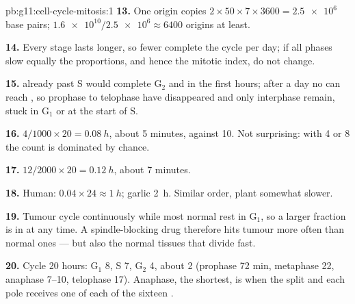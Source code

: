 \begin{solution}{pb:g11:cell-cycle-mitosis:1}
\textbf{13.} One origin copies $2 \times 50 \times 7 \times 3600 =
\num{2.5e6}$ base pairs; $\num{1.6e10}/\num{2.5e6} \approx 6400$
origins at least.

\textbf{14.} Every stage lasts longer, so fewer  complete the
cycle per day; if all phases slow equally the proportions, and hence
the mitotic index, do not change.

\textbf{15.}  already past S would complete $\mathrm{G_2}$ and
 in the first hours; after a day no  can reach , so
prophase to telophase have disappeared and only interphase 
remain, stuck in $\mathrm{G_1}$ or at the start of S.

\textbf{16.} $4/1000 \times 20 = \qty{0.08}{h}$, about 5 minutes,
against 10. Not surprising: with 4 or 8  the count is dominated
by chance.

\textbf{17.} $12/2000 \times 20 = \qty{0.12}{h}$, about 7 minutes.

\textbf{18.} Human: $0.04 \times 24 \approx \qty{1}{h}$; garlic
\qty{2}{h}. Similar order, plant  somewhat slower.

\textbf{19.} Tumour  cycle continuously while most normal 
rest in $\mathrm{G_1}$, so a larger fraction is in  at any
time. A spindle-blocking drug therefore hits tumour  more often
than normal ones --- but also the normal tissues that divide fast.

\textbf{20.} Cycle 20 hours: $\mathrm{G_1}$ 8, S 7, $\mathrm{G_2}$ 4,
 about 2 (prophase 72 min, metaphase 22, anaphase 7--10,
telophase 17). Anaphase, the shortest, is when the  split
and each pole receives one  of each of the sixteen
.
\end{solution}
